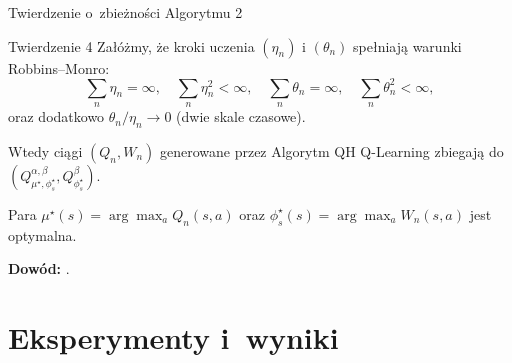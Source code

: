\documentclass[aspectratio=169]{beamer}
\begin{document}
\begin{frame}{Twierdzenie o~zbieżności Algorytmu 2}
\begin{block}{Twierdzenie 4 \cite{eshwar2025}}
Załóżmy, że kroki uczenia $(\eta_n)$ i $(\theta_n)$ spełniają warunki Robbins--Monro:
\[
\sum_n \eta_n = \infty, \quad \sum_n \eta_n^2 < \infty, \quad \sum_n \theta_n = \infty, \quad \sum_n \theta_n^2 < \infty,
\]
oraz dodatkowo $\theta_n / \eta_n \to 0$ (dwie skale czasowe).

Wtedy ciągi $(Q_n, W_n)$ generowane przez Algorytm QH Q-Learning zbiegają do $(Q^{\alpha, \beta}_{\mu^\star, \phi_s^\star}, Q^{\beta}_{\phi_s^\star})$.

Para $\mu^\star(s) = \arg\max_a Q_n(s,a)$ oraz $\phi_s^\star(s) = \arg\max_a W_n(s,a)$ jest optymalna.
\end{block}

\vspace{1em}
\textbf{Dowód:} \cite{eshwar2025,borkar2008}.
\end{frame}

\section{Eksperymenty i~wyniki}
\end{document}
